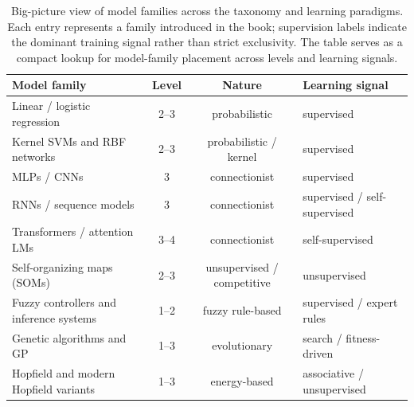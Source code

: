 \begin{table}[b]
\centering
\captionsetup{width=.92\linewidth}
\caption{Big-picture view of model families across the taxonomy and learning paradigms. Each entry represents a family introduced in the book; supervision labels indicate the dominant training signal rather than strict exclusivity. The table serves as a compact lookup for model-family placement across levels and learning signals.}
\label{tab:big-picture-models}
\begin{tabularx}{\linewidth}{@{}>{\raggedright\arraybackslash}X c c >{\raggedright\arraybackslash}X@{}}
\toprule
Model family & Level & Nature & Learning signal \\
\midrule
Linear / logistic regression & 2--3 & probabilistic & supervised \\
Kernel SVMs and RBF networks & 2--3 & probabilistic / kernel & supervised \\
MLPs / CNNs & 3 & connectionist & supervised \\
RNNs / sequence models & 3 & connectionist & supervised / self-supervised \\
Transformers / attention LMs & 3--4 & connectionist & self-supervised \\
Self-organizing maps (SOMs) & 2--3 & unsupervised / competitive & unsupervised \\
Fuzzy controllers and inference systems & 1--2 & fuzzy rule-based & supervised / expert rules \\
Genetic algorithms and GP & 1--3 & evolutionary & search / fitness-driven \\
Hopfield and modern Hopfield variants & 1--3 & energy-based & associative / unsupervised \\
\bottomrule
\end{tabularx}
\end{table}
